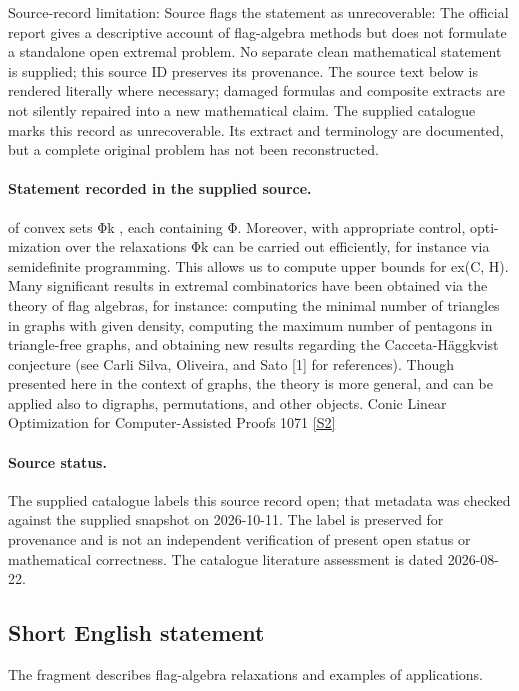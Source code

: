 \documentclass[11pt]{article}
\begin{document}
Source-record limitation: Source flags the statement as unrecoverable: The official report gives a descriptive account of flag-algebra methods but does not formulate a standalone open extremal problem. No separate clean mathematical statement is supplied; this source ID preserves its provenance.
The source text below is rendered literally where necessary; damaged formulas and composite extracts are not silently repaired into a new mathematical claim.
The supplied catalogue marks this record as unrecoverable. Its extract and terminology are documented, but a complete original problem has not been reconstructed.
\paragraph{Statement recorded in the supplied source.}
of convex sets Φk , each containing Φ. Moreover, with appropriate control, opti- mization over the relaxations Φk can be carried out efficiently, for instance via semidefinite programming. This allows us to compute upper bounds for ex(C, H). Many significant results in extremal combinatorics have been obtained via the theory of flag algebras, for instance: computing the minimal number of triangles in graphs with given density, computing the maximum number of pentagons in triangle-free graphs, and obtaining new results regarding the Cacceta-Häggkvist conjecture (see Carli Silva, Oliveira, and Sato [1] for references). Though presented here in the context of graphs, the theory is more general, and can be applied also to digraphs, permutations, and other objects. Conic Linear Optimization for Computer-Assisted Proofs 1071 \href{https://doi.org/10.4171/owr/2022/20}{[S2]}
\paragraph{Source status.}
The supplied catalogue labels this source record open; that metadata was checked against the supplied snapshot on 2026-10-11. The label is preserved for provenance and is not an independent verification of present open status or mathematical correctness. The catalogue literature assessment is dated 2026-08-22.
\subsection{Short English statement}
The fragment describes flag-algebra relaxations and examples of applications.
\end{document}
